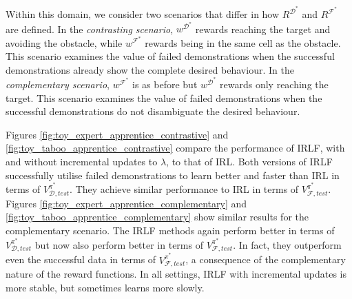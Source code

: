 \documentclass[letterpaper]{article}
\newcommand{\jm}[1]{\textcolor{blue}{Joao: #1}}
\newcommand{\ks}[1]{\textcolor{green}{Kyriacos: #1}}
\newcommand{\jm}[1]{}
\newcommand{\ks}[1]{}
\begin{document}

Within this domain, we consider two scenarios that differ in how $R^{\mathcal{D}^*}$ and $R^{\mathcal{F}^*}$ are defined.  In the \emph{contrasting scenario}, $w^{\mathcal{D}^*}$ rewards reaching the target and avoiding the obstacle, while $w^{\mathcal{F}^*}$ rewards being in the same cell as the obstacle.  This scenario examines the value of failed demonstrations when the successful demonstrations already show the complete desired behaviour.  In the \emph{complementary scenario}, $w^{\mathcal{F}^*}$ is as before but $w^{\mathcal{D}^*}$ rewards only reaching the target. This scenario examines the value of failed demonstrations when the successful demonstrations do not disambiguate the desired behaviour.


Figures \ref{fig:toy_expert_apprentice_contrastive} and \ref{fig:toy_taboo_apprentice_contrastive} compare the performance of IRLF, with and without incremental updates to $\lambda$, to that of IRL.  Both versions of IRLF successfully utilise failed demonstrations to learn better and faster than IRL in terms of $V^{\pi^*}_{\mathcal{D},test}$.  They achieve similar performance to IRL in terms of $V^{\pi^*}_{\mathcal{F},test}$.  Figures \ref{fig:toy_expert_apprentice_complementary} and \ref{fig:toy_taboo_apprentice_complementary} show similar results for the complementary scenario.  The IRLF methods again perform better in terms of $V^{\pi^*}_{\mathcal{D},test}$ but now also perform better in terms of $V^{\pi^*}_{\mathcal{F},test}$.  In fact, they outperform even the successful data in terms of $V^{\pi^*}_{\mathcal{F},test}$, a consequence of the complementary nature of the reward functions.  In all settings, IRLF with incremental updates is more stable, but sometimes learns more slowly.


\end{document}
